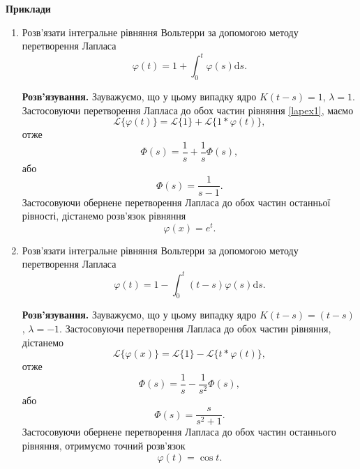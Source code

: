 \documentclass[14pt,twoside]{extreport}
\theoremstyle{mystyle}
\numberwithin{equation}{chapter}
\begin{document}
\begin{small}
	\textbf{Приклади}
	\begin{enumerate}
		\item Розв'язати інтегральне рівняння Вольтерри за допомогою методу перетворення Лапласа
		\begin{equation}\label{lapex1}
		\varphi(t)=1+\displaystyle \int_{0}^{t}\varphi(s)\mathrm{d}s.
		\end{equation}
		
		\textbf{Розв'язування.}
		Зауважуємо, що у цьому випадку ядро $K(t-s)=1$, $\lambda=1$. Застосовуючи перетворення Лапласа до обох частин рівняння \eqref{lapex1}, маємо
		\begin{equation*}
			\mathcal{L}\{\varphi(t)\}=\mathcal{L}\{1\}+\mathcal{L}\{1*\varphi(t)\},
		\end{equation*}
		отже
		\begin{equation*}
			\Phi(s)=\displaystyle \frac{1}{s}+\frac{1}{s}\Phi(s),
		\end{equation*}
		або
		\begin{equation*}
			\Phi(s)=\displaystyle \frac{1}{s-1}.
		\end{equation*}
		Застосовуючи обернене перетворення Лапласа до обох частин останньої рівності, дістанемо розв'язок рівняння
		\begin{equation*}
			\varphi(x)=e^{t}.
		\end{equation*}
		
		\item Розв'язати інтегральне рівняння Вольтерри за допомогою методу перетворення Лапласа
		\begin{equation*}
			\varphi(t)=1-\int_{0}^{t}(t-s)\varphi(s)\mathrm{d}s.
		\end{equation*}
		
		\textbf{Розв'язування.}
		Зауважуємо, що у цьому випадку ядро $K(t-s)=(t-s)$, $\lambda=-1$. Застосовуючи перетворення Лапласа до обох частин рівняння, дістанемо
		\begin{equation*}
			\mathcal{L}\{\varphi(x)\}=\mathcal{L}\{1\}-\mathcal{L}\{t*\varphi(t)\},
		\end{equation*}
		отже
		\begin{equation*}
			\Phi(s)=\displaystyle \frac{1}{s}-\frac{1}{s^{2}}\Phi(s),
		\end{equation*}
		або
		\begin{equation*}
			\Phi(s)=\displaystyle \frac{s}{s^{2}+1}.
		\end{equation*}
		Застосовуючи обернене перетворення Лапласа до обох частин останнього рівняння, отримуємо точний розв'язок
		\begin{equation*}
			\varphi(t)=\cos t.
		\end{equation*}
		

\end{enumerate}
\end{small}
\end{document}
